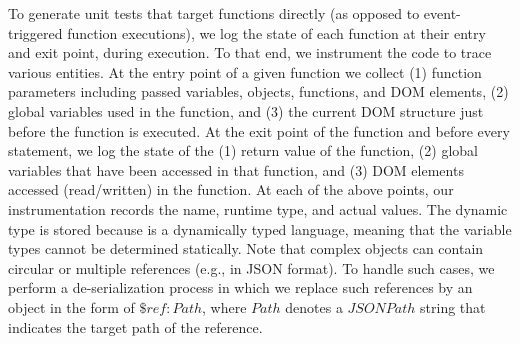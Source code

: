  \label{Sec:jsFuncTesting}
To generate unit tests that target \javascript functions directly (as opposed to event-triggered function executions), we log the state of each function at their entry and exit point, during execution.
To that end, we instrument the code to trace  various entities.
%
At the entry point of a given \javascript function we collect (1) function parameters including passed variables, objects, functions, and DOM elements, (2) global variables used in the function, and (3) the current DOM structure just before the function is executed. At the exit point of the \javascript function and before every  statement, we log the state of the (1) return value of the function, (2) global variables that have been accessed in that function, and (3) DOM elements accessed (read/written) in the function.
At each of the above points, our instrumentation records the name, runtime type, and actual values.
The dynamic type is stored because \javascript is a dynamically typed language, meaning that the variable types cannot be determined statically. 
Note that complex \javascript objects can contain circular or multiple references (e.g., in JSON format). To handle such cases, we perform a de-serialization process in which we replace such references by an object in the form
of ${\$ref: Path}$, where $Path$ denotes a $JSONPath$ string that indicates the target path of the reference.

